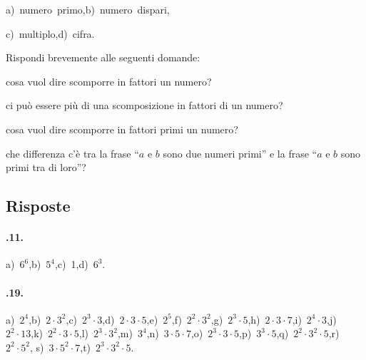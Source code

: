 \begin{multicols}{2}
\begin{esercizio}
a)~numero~primo,\quad b)~numero~dispari,

c)~multiplo,\quad d)~cifra.
\end{esercizio}

\begin{esercizio}
Rispondi brevemente alle seguenti domande:
 \begin{enumeratea}
 \item cosa vuol dire scomporre in fattori un numero?
 \item ci può essere più di una scomposizione in fattori di un numero?
 \item cosa vuol dire scomporre in fattori primi un numero?
 \item che differenza c'è tra la frase ``$a$ e $b$ sono due numeri primi'' e la frase ``$a$ e $b$ sono primi tra di loro''?
 \end{enumeratea}
\end{esercizio}
\end{multicols}

\subsection{Risposte}

\paragraph{\thechapter.11.}
a)~$6^6$,\quad b)~$5^4$,\quad c)~1,\quad d)~$6^3$.

\paragraph{\thechapter.19.}
a)~$2^4$,\quad b)~$ 2\cdot 3^2 $,\quad c)~$ 2^3 \cdot 3 $,\quad d)~$ 2\cdot 3\cdot 5 $,\quad e)~$ 2^5 $,\quad f)~$ 2^2 \cdot 3^2 $,\quad g)~$ 2^3 \cdot 5 $,\quad h)~$ 2\cdot 3\cdot 7 $,\quad i)~$ 2^4 \cdot 3 $,\quad j)~$ 2^2 \cdot 13 $,\quad k)~$ 2^2 \cdot 3 \cdot5 $,\quad l)~$ 2^3 \cdot 3^2 $,\quad m)~$ 3^4 $,\quad n)~$ 3\cdot 5\cdot 7 $,\quad o)~$ 2^3 \cdot 3\cdot 5 $,\quad p)~$ 3^3 \cdot 5 $,\quad q)~$ 2^2 \cdot 3^2 \cdot 5 $,\quad r)~$ 2^2 \cdot 5^2 $, s)~$3\cdot5^2\cdot7$,\quad t)~$ 2^3 \cdot 3^2 \cdot5$.

